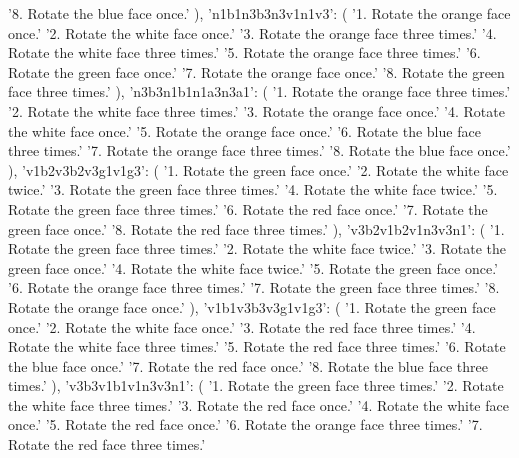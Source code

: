 {{            '8. Rotate the blue face once.'
        ),
        'n1b1n3b3n3v1n1v3': (
            '1. Rotate the orange face once.\n'
            '2. Rotate the white face once.\n'
            '3. Rotate the orange face three times.\n'
            '4. Rotate the white face three times.\n'
            '5. Rotate the orange face three times.\n'
            '6. Rotate the green face once.\n'
            '7. Rotate the orange face once.\n'
            '8. Rotate the green face three times.'
        ),
        'n3b3n1b1n1a3n3a1': (
            '1. Rotate the orange face three times.\n'
            '2. Rotate the white face three times.\n'
            '3. Rotate the orange face once.\n'
            '4. Rotate the white face once.\n'
            '5. Rotate the orange face once.\n'
            '6. Rotate the blue face three times.\n'
            '7. Rotate the orange face three times.\n'
            '8. Rotate the blue face once.'
        ),
        'v1b2v3b2v3g1v1g3': (
            '1. Rotate the green face once.\n'
            '2. Rotate the white face twice.\n'
            '3. Rotate the green face three times.\n'
            '4. Rotate the white face twice.\n'
            '5. Rotate the green face three times.\n'
            '6. Rotate the red face once.\n'
            '7. Rotate the green face once.\n'
            '8. Rotate the red face three times.'
        ),
        'v3b2v1b2v1n3v3n1': (
            '1. Rotate the green face three times.\n'
            '2. Rotate the white face twice.\n'
            '3. Rotate the green face once.\n'
            '4. Rotate the white face twice.\n'
            '5. Rotate the green face once.\n'
            '6. Rotate the orange face three times.\n'
            '7. Rotate the green face three times.\n'
            '8. Rotate the orange face once.'
        ),
        'v1b1v3b3v3g1v1g3': (
            '1. Rotate the green face once.\n'
            '2. Rotate the white face once.\n'
            '3. Rotate the red face three times.\n'
            '4. Rotate the white face three times.\n'
            '5. Rotate the red face three times.\n'
            '6. Rotate the blue face once.\n'
            '7. Rotate the red face once.\n'
            '8. Rotate the blue face three times.'
        ),
        'v3b3v1b1v1n3v3n1': (
            '1. Rotate the green face three times.\n'
            '2. Rotate the white face three times.\n'
            '3. Rotate the red face once.\n'
            '4. Rotate the white face once.\n'
            '5. Rotate the red face once.\n'
            '6. Rotate the orange face three times.\n'
            '7. Rotate the red face three times.\n'
}}
